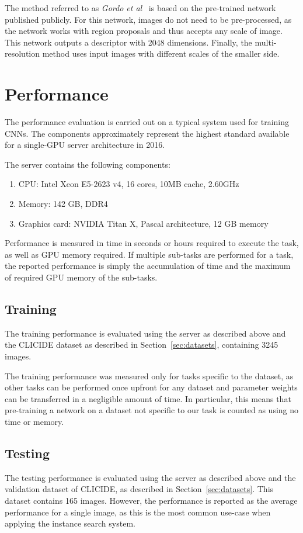 The method referred to as \emph{Gordo et al}~\cite{gordo_deep_2016}
is based on the pre-trained network published publicly.
For this network, images do not need to
be pre-processed, as the network works with region proposals and thus accepts
any scale of image. This network outputs a descriptor with 2048 dimensions.
Finally, the multi-resolution method uses input images with different
scales of the smaller side.

\section{Performance}
The performance evaluation is carried out on a typical system used for training CNNs.
The components approximately represent the highest standard available for a
single-GPU server architecture in 2016.

The server contains the following components:
\begin{enumerate}
    \item CPU: Intel\textsuperscript{\textregistered} Xeon\textsuperscript{\textregistered}
    E5-2623 v4, 16 cores, 10MB cache, 2.60GHz
    \item Memory: 142 GB, DDR4 %
    \item Graphics card: NVIDIA\textsuperscript{\textregistered} Titan X, Pascal architecture,
    12 GB memory
\end{enumerate}

Performance is measured in time in seconds or hours required to execute the task,
as well as GPU memory required. If multiple sub-tasks are performed for
a task, the reported performance is simply the accumulation of time and
the maximum of required GPU memory of the sub-tasks.
\subsection{Training}
The training performance is evaluated using the server as described above and the
CLICIDE dataset as described in Section~\ref{sec:datasets}, containing 3245 images.

The training performance was measured only for tasks specific to the dataset,
as other tasks can be performed once upfront for any dataset and parameter
weights can be transferred in a negligible amount of time. In particular, this means
that pre-training a network on a dataset not specific to our task is
counted as using no time or memory.

\subsection{Testing}
The testing performance is evaluated using the server as described above and
the validation dataset of CLICIDE, as described in Section~\ref{sec:datasets}.
This dataset contains 165 images. However, the performance is reported
as the average performance for a single image, as this is the most common
use-case when applying the instance search system.
